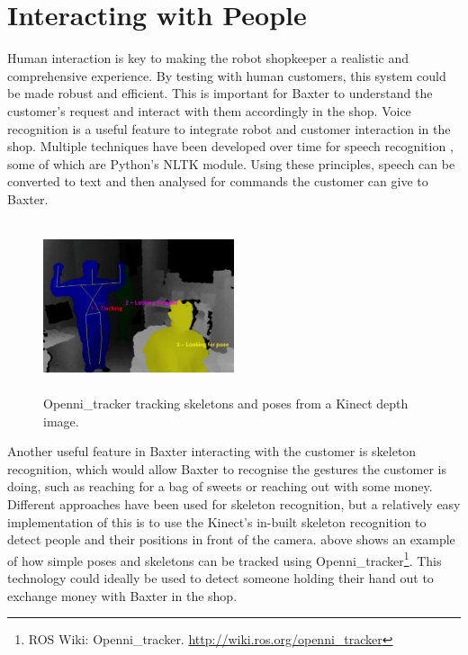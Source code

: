 \section{Interacting with People}
Human interaction is key to making the robot shopkeeper a realistic and comprehensive experience. By testing with human customers, this system could be made robust and efficient. This is important for Baxter to understand the customer's request and interact with them accordingly in the shop.
\newline\newline
Voice recognition is a useful feature to integrate robot and customer interaction in the shop. Multiple techniques have been developed over time for speech recognition \cite{speech}, some of which are Python's NLTK module. Using these principles, speech can be converted to text and then analysed for commands the customer can give to Baxter.
\captionsetup[figure]{justification=centering}
\begin{figure}[H]
        \centering 
        \includegraphics[width=0.5\textwidth, height=5cm]{skeletontracking.png}
        \caption{Openni\_tracker tracking skeletons and poses from a Kinect depth image.}
        \label{fig:skeletons}
\end{figure}
Another useful feature in Baxter interacting with the customer is skeleton recognition, which would allow Baxter to recognise the gestures the customer is doing, such as reaching for a bag of sweets or reaching out with some money. Different approaches have been used for skeleton recognition, but a relatively easy implementation of this is to use the Kinect's in-built skeleton recognition to detect people and their positions in front of the camera. \textbf{} above shows an example of how simple poses and skeletons can be tracked using Openni\_tracker\footnote{ROS Wiki: Openni\_tracker. \url{http://wiki.ros.org/openni\_tracker}}. This technology could ideally be used to detect someone holding their hand out to exchange money with Baxter in the shop.